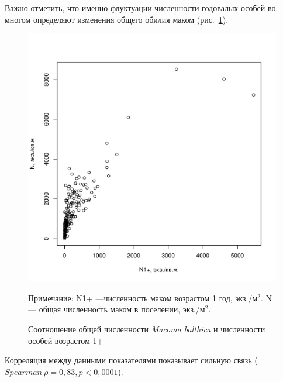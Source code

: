 Важно отметить, что именно флуктуации численности годовалых особей во-многом определяют изменения общего обилия маком (рис.~\ref{ris:N1year_vs_Nall}).
    \begin{figure}[p]
        \includegraphics[width=\textwidth]{../White_Sea/oneyear_all_Kandalaksha_all/N1y_vs_N2_1.pdf}
    \caption{Соотношение общей численности {\it Macoma balthica} и численности особей возрастом 1+}
    \label{ris:N1year_vs_Nall}

	\footnotesize{Примечание: N1+ ---численность маком возрастом 1 год, экз./м$^2$. N --- общая численность маком в поселении, экз./м$^2$.}
    \end{figure}
Корреляция между данными показателями показывает сильную связь ($Spearman\ \rho = 0,83, p < 0,0001$).

